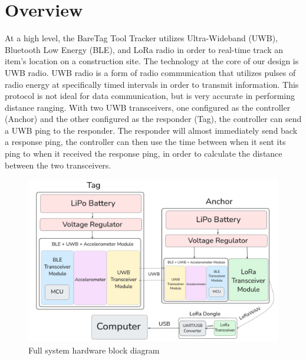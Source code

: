 \documentclass[conference]{IEEEtran}
\begin{document}
\section{Overview}
At a high level, the BareTag Tool Tracker utilizes Ultra-Wideband (UWB), Bluetooth Low Energy (BLE), and LoRa radio in order to real-time track an item's location on a construction site. The technology at the core of our design is UWB radio. UWB radio is a form of radio communication that utilizes pulses of radio energy at specifically timed intervals in order to transmit information. This protocol is not ideal for data communication, but is very accurate in performing distance ranging. With two UWB transceivers, one configured as the controller (Anchor) and the other configured as the responder (Tag), the controller can send a UWB ping to the responder. The responder will almost immediately send back a response ping, the controller can then use the time between when it sent its ping to when it received the response ping, in order to calculate the distance between the two transceivers. 

\begin{figure}
\includegraphics[scale=0.185]{Screenshot from 2024-10-18 21-37-02.png}
\caption{Full system hardware block diagram}
\end{figure}
\end{document}

